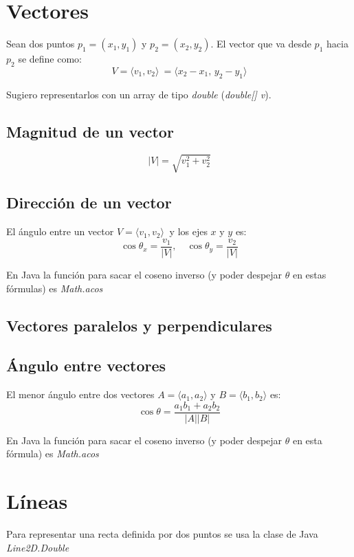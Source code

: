 \documentclass{article}
\begin{document}
\begin{multicols}{2}
\section{Vectores}
Sean dos puntos \( p_1 = (x_1, y_1) \) y \( p_2 = (x_2, y_2) \). El vector que va desde \( p_1 \) hacia \( p_2 \) se define como:
\[ V = \langle v_1, v_2 \rangle \ = \langle x_2 - x_1, \, y_2 - y_1 \rangle \]

Sugiero representarlos con un array de tipo \emph{double} (\emph{double[] v}).

\subsection{Magnitud de un vector}
\[ |V| = \sqrt{v_1^2 + v_2^2} \]

\subsection{Dirección de un vector}
El ángulo entre un vector \( V = \langle v_1, v_2 \rangle \ \) y los ejes \( x \) y \( y \) es:
\[ \cos \theta_x = \frac{v_1}{|V|}, \quad \cos \theta_y = \frac{v_2}{|V|} \]

En Java la función para sacar el coseno inverso (y poder despejar \( \theta \) en estas fórmulas) es \emph{Math.acos}

\subsection{Vectores paralelos y perpendiculares}


\subsection{Ángulo entre vectores}
El menor ángulo entre dos vectores \( A = \langle a_1, a_2 \rangle \) y \( B = \langle b_1, b_2 \rangle \) es:
\[ \cos \theta = \frac{a_1 b_1 + a_2 b_2}{|A| |B|} \]

En Java la función para sacar el coseno inverso (y poder despejar \( \theta \) en esta fórmula) es \emph{Math.acos}


\section{Líneas}
Para representar una recta definida por dos puntos se usa la clase de Java \emph{Line2D.Double}



\end{multicols}
\end{document}
